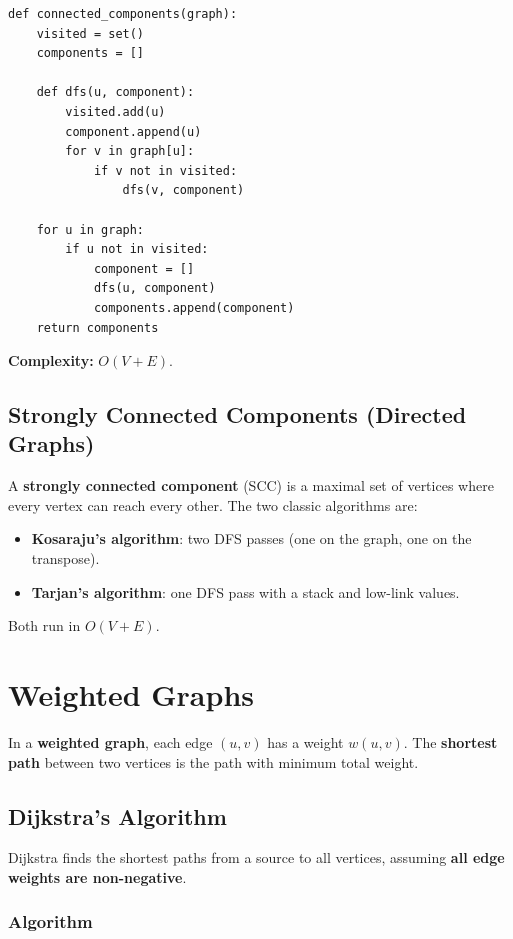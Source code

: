 \documentclass[11pt,a4paper]{article}
\begin{document}
\begin{lstlisting}
def connected_components(graph):
    visited = set()
    components = []

    def dfs(u, component):
        visited.add(u)
        component.append(u)
        for v in graph[u]:
            if v not in visited:
                dfs(v, component)

    for u in graph:
        if u not in visited:
            component = []
            dfs(u, component)
            components.append(component)
    return components
\end{lstlisting}

\textbf{Complexity:} $O(V + E)$.

\subsection{Strongly Connected Components (Directed Graphs)}

A \textbf{strongly connected component} (SCC) is a maximal set of vertices where every vertex can reach every other. The two classic algorithms are:
\begin{itemize}
    \item \textbf{Kosaraju's algorithm}: two DFS passes (one on the graph, one on the transpose).
    \item \textbf{Tarjan's algorithm}: one DFS pass with a stack and low-link values.
\end{itemize}

Both run in $O(V + E)$.

\section{Weighted Graphs}

In a \textbf{weighted graph}, each edge $(u, v)$ has a weight $w(u, v)$. The \textbf{shortest path} between two vertices is the path with minimum total weight.

\subsection{Dijkstra's Algorithm}

Dijkstra finds the shortest paths from a source to all vertices, assuming \textbf{all edge weights are non-negative}.

\subsubsection{Algorithm}
\end{document}
